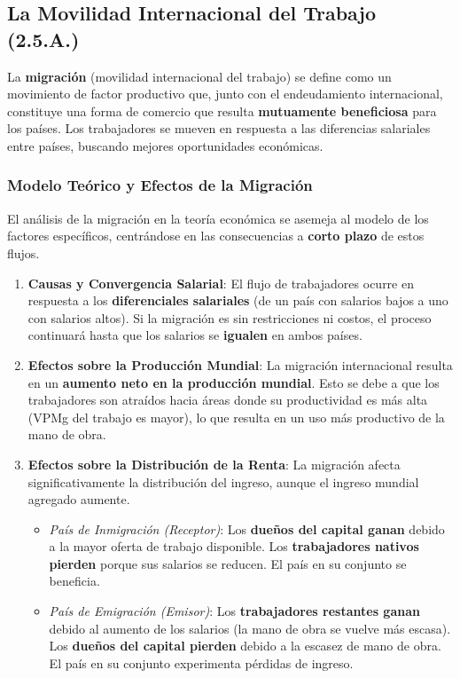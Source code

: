 \subsection{La Movilidad Internacional del Trabajo (2.5.A.)}
La \textbf{migración} (movilidad internacional del trabajo) se define como un movimiento de factor productivo que, junto con el endeudamiento internacional, constituye una forma de comercio que resulta \textbf{mutuamente beneficiosa} para los países. Los trabajadores se mueven en respuesta a las diferencias salariales entre países, buscando mejores oportunidades económicas.

\subsubsection{Modelo Teórico y Efectos de la Migración}
El análisis de la migración en la teoría económica se asemeja al modelo de los factores específicos, centrándose en las consecuencias a \textbf{corto plazo} de estos flujos.

\begin{enumerate}
    \item \textbf{Causas y Convergencia Salarial}: El flujo de trabajadores ocurre en respuesta a los \textbf{diferenciales salariales} (de un país con salarios bajos a uno con salarios altos). Si la migración es sin restricciones ni costos, el proceso continuará hasta que los salarios se \textbf{igualen} en ambos países.
    \item \textbf{Efectos sobre la Producción Mundial}: La migración internacional resulta en un \textbf{aumento neto en la producción mundial}. Esto se debe a que los trabajadores son atraídos hacia áreas donde su productividad es más alta (VPMg del trabajo es mayor), lo que resulta en un uso más productivo de la mano de obra.
    \item \textbf{Efectos sobre la Distribución de la Renta}: La migración afecta significativamente la distribución del ingreso, aunque el ingreso mundial agregado aumente.
    \begin{itemize}
        \item \textit{País de Inmigración (Receptor)}: Los \textbf{dueños del capital ganan} debido a la mayor oferta de trabajo disponible. Los \textbf{trabajadores nativos pierden} porque sus salarios se reducen. El país en su conjunto se beneficia.
        \item \textit{País de Emigración (Emisor)}: Los \textbf{trabajadores restantes ganan} debido al aumento de los salarios (la mano de obra se vuelve más escasa). Los \textbf{dueños del capital pierden} debido a la escasez de mano de obra. El país en su conjunto experimenta pérdidas de ingreso.
    \end{itemize}
\end{enumerate}

